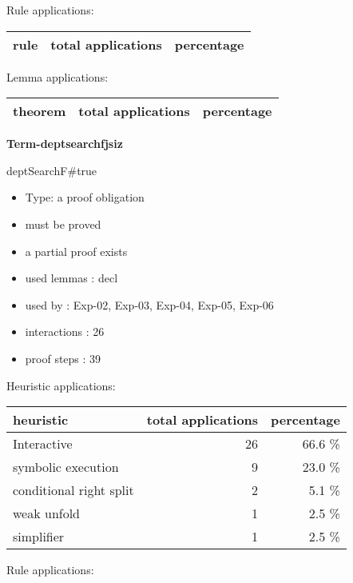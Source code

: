 \documentclass[a4paper]{article}
\begin{document}
Rule applications:

\begin{supertabular}{l|r|r}
rule	        & total applications & percentage \\ \hline

\end{supertabular}

Lemma applications:

\begin{supertabular}{l|r|r}
theorem	        & total applications & percentage \\ \hline

\end{supertabular}
\pagebreak

{\LARGE\bf Term-deptsearchfjsiz}\label{lemma-Term-deptsearchfjsiz}

\medskip

 \Fol \Do deptSearchF\#\Dc true

\begin{itemize}

\item Type: a proof obligation

\item       must be proved
\item       a partial proof exists
\item       used lemmas  : decl
\item       used by      : Exp-02, Exp-03, Exp-04, Exp-05, Exp-06
\item       interactions : 26
\item       proof steps  : 39
\end{itemize}

\medskip


Heuristic applications:

\begin{supertabular}{l|r|r}
heuristic	& total applications & percentage \\ \hline
Interactive & 26 & 66.6 \% \\
symbolic execution & 9 & 23.0 \% \\
conditional right split & 2 & 5.1 \% \\
weak unfold & 1 & 2.5 \% \\
simplifier & 1 & 2.5 \% \\

\end{supertabular}

Rule applications:
\end{document}
